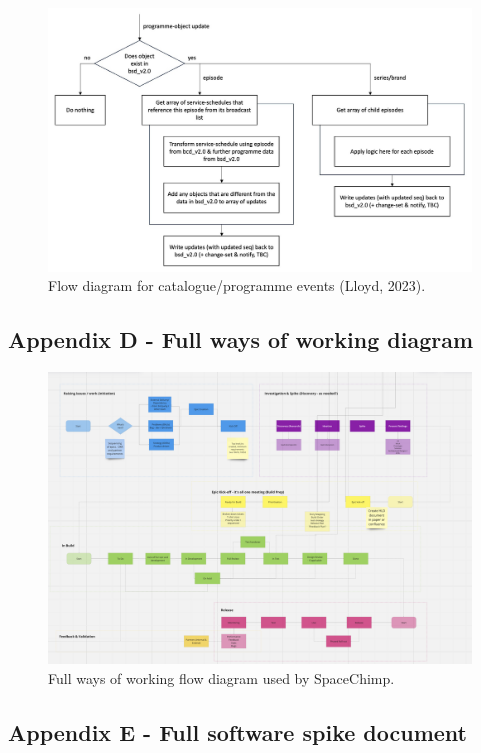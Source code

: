     \begin{figure}[H]
      \centering
      \includegraphics[width=12cm]{assets/initialDesign/programmeUpdate.jpg}
      \caption{Flow diagram for catalogue/programme events (Lloyd, 2023).}
      \label{fig:initialDesignProgrammes}
    \end{figure}

  
  \newpage
  \subsection{Appendix D - Full ways of working diagram}
    \label{sec:AppendixD}
    \begin{figure}[H]
      \centering
      \includegraphics[width=12cm]{assets/workflow/fullWorkflow.png}
      \caption{Full ways of working flow diagram used by SpaceChimp.}
      \label{fig:fullWorkflow}
    \end{figure}


  \newpage
  \subsection{Appendix E - Full software spike document}
    \label{sec:AppendixE}
    

